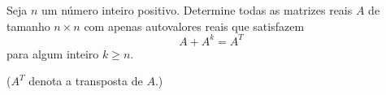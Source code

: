 Seja \(n\) um número inteiro positivo. Determine todas as matrizes reais \(A\) de tamanho \(n \times n\) com apenas autovalores reais que satisfazem
\[
A + A^k = A^T
\]
para algum inteiro \(k \ge n\).

(\(A^T\) denota a transposta de \(A\).)
